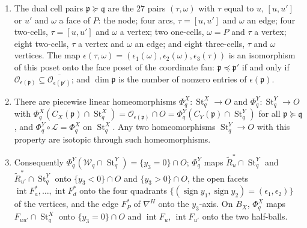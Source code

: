 \begin{lemma}\label{lem:D}
\begin{enumerate}
\item The dual cell pairs ${\mathfrak p}\succeq{\mathfrak q}$ are the $27$ pairs $(\tau,\omega)$ with $\tau$ equal to $u$, $[u,u']$ or $u'$ and
$\omega$ a face of $P$: the node; four arcs, $\tau=[u,u']$ and $\omega$ an edge; four two-cells, $\tau=[u,u']$ and
$\omega$ a vertex; two one-cells, $\omega=P$ and $\tau$ a vertex; eight two-cells, $\tau$ a vertex and $\omega$ an edge;
and eight three-cells, $\tau$ and $\omega$ vertices. The map
$\epsilon(\tau,\omega)=(\epsilon_1(\omega),\epsilon_2(\omega),\epsilon_3(\tau))$ is an isomorphism of this poset onto the
face poset of the coordinate fan: ${\mathfrak p}\preceq {\mathfrak p}'$ if and only if $\mathcal O_{\epsilon({\mathfrak p})}\subseteq
\overline{\mathcal O_{\epsilon({\mathfrak p}')}}$; and $\dim{\mathfrak p}$ is the number of nonzero entries of $\epsilon({\mathfrak p})$.
\item There are piecewise linear homeomorphisms $\Phi^X_q\colon\operatorname{St}^X_q\to O$ and
$\Phi^Y_q\colon\operatorname{St}^Y_q\to O$ with $\Phi^X_q(C_X({\mathfrak p})\cap\operatorname{St}^X_q)=\mathcal O_{\epsilon({\mathfrak p})}\cap O=
\Phi^Y_q(C_Y({\mathfrak p})\cap\operatorname{St}^Y_q)$ for all ${\mathfrak p}\succeq{\mathfrak q}$, and $\Phi^Y_q\circ\mathcal L=\Phi^X_q$ on
$\operatorname{St}^X_q$. Any two homeomorphisms $\operatorname{St}^Y_q\to O$ with this property are isotopic through such
homeomorphisms.
\item Consequently $\Phi^Y_q(\mathcal W_q\cap\operatorname{St}^Y_q)=\{y_3=0\}\cap O$; $\Phi^Y_q$ maps
$\widetilde R^*_u\cap\operatorname{St}^Y_q$ and $\widetilde R^*_{u'}\cap\operatorname{St}^Y_q$ onto $\{y_3<0\}\cap O$ and
$\{y_3>0\}\cap O$, the open facets $\operatorname{int}F^*_a,\dots,\operatorname{int}F^*_d$ onto the four quadrants
$\{(\operatorname{sign}y_1,\operatorname{sign}y_2)=(\epsilon_1,\epsilon_2)\}$ of the vertices, and the edge $F^*_P$ of
$\nabla^H$ onto the $y_3$-axis. On $B_X$, $\Phi^X_q$ maps $F_{uu'}\cap\operatorname{St}^X_q$ onto $\{y_3=0\}\cap O$ and
$\operatorname{int}F_u$, $\operatorname{int}F_{u'}$ onto the two half-balls.
\end{enumerate}
\end{lemma}
